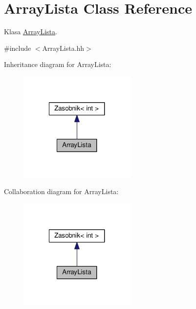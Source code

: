 \hypertarget{a00008}{}\section{Array\+Lista Class Reference}
\label{a00008}


Klasa \hyperlink{a00008}{Array\+Lista}.  




{\ttfamily \#include $<$Array\+Lista.\+hh$>$}



Inheritance diagram for Array\+Lista\+:
\nopagebreak
\begin{figure}[H]
\begin{center}
\leavevmode
\includegraphics[width=164pt]{a00136}
\end{center}
\end{figure}


Collaboration diagram for Array\+Lista\+:
\nopagebreak
\begin{figure}[H]
\begin{center}
\leavevmode
\includegraphics[width=164pt]{a00137}
\end{center}
\end{figure}
